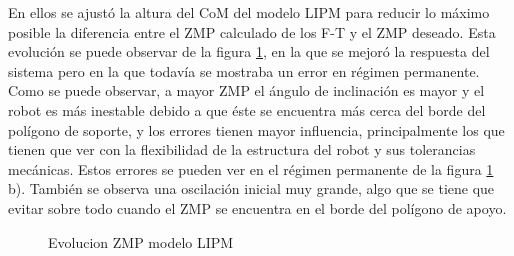 En ellos se ajustó la altura del CoM del modelo LIPM para reducir lo máximo posible la diferencia entre el ZMP calculado de los F-T y el ZMP deseado. Esta evolución se puede observar de la figura \ref{figura55}, en la que se mejoró la respuesta del sistema pero en la que todavía se mostraba un error en régimen permanente. Como se puede observar, a mayor ZMP el ángulo de inclinación es mayor y el robot es más inestable debido a que éste se encuentra más cerca del borde del polígono de soporte, y los errores tienen mayor influencia, principalmente los que tienen que ver con la flexibilidad de la estructura del robot y sus tolerancias mecánicas. Estos errores se pueden ver en el régimen permanente de la figura \ref{figura55} b). También se observa una oscilación inicial muy grande, algo que se tiene que evitar sobre todo cuando el ZMP se encuentra en el borde del polígono de apoyo. 

\begin{figure}[H]
\centering
{}
\quad
{}
\caption{Evolucion ZMP modelo LIPM}
\label{figura55}
\end{figure}

